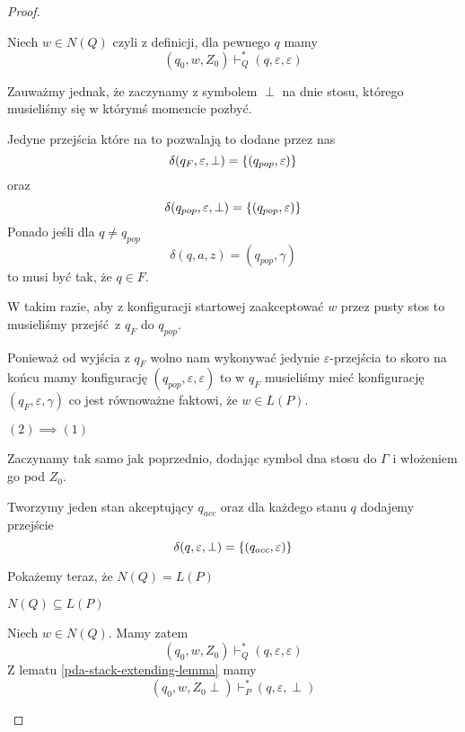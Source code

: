 \begin{proof}
\begin{description}
\begin{description}
			            Niech \( w \in N(Q) \) czyli z definicji, dla pewnego \( q \) mamy
			            \[
				            (q_0, w, Z_0) \vdash_Q^* (q, \varepsilon, \varepsilon)
			            \]

			            Zauważmy jednak, że zaczynamy z symbolem \( \perp \) na dnie stosu, którego musieliśmy się w którymś momencie pozbyć.

			            Jedyne przejścia które na to pozwalają to dodane przez nas
			            \[
				            \delta(q_F, \varepsilon, \perp) = \set{(q_{pop}, \varepsilon)}
			            \]
			            oraz
			            \[
				            \delta(q_{pop}, \varepsilon, \perp) = \set{(q_{pop}, \varepsilon)}
			            \]
			            Ponado jeśli dla \( q \neq q_{pop} \)
			            \[
				            \delta(q, a, z) = {(q_{pop}, \gamma)}
			            \]
			            to musi być tak, że \( q \in F \).

			            W takim razie, aby z konfiguracji startowej zaakceptować \( w \) przez pusty stos to musieliśmy przejść z \( q_F \) do \( q_{pop} \).

			            Ponieważ od wyjścia z \( q_F \) wolno nam wykonywać jedynie \(\varepsilon\)-przejścia to skoro na końcu mamy konfigurację \( (q_{pop}, \varepsilon, \varepsilon) \) to w \( q_F \) musieliśmy mieć konfigurację \( (q_F, \varepsilon, \gamma) \) co jest równoważne faktowi, że \( w \in L(P) \).


		      \end{description}

		\item \( (2) \implies (1) \)

		      Zaczynamy tak samo jak poprzednio, dodając symbol dna stosu do \( \Gamma \) i włożeniem go pod \( Z_0 \).

		      Tworzymy jeden stan akceptujący \( q_{acc} \) oraz dla każdego stanu \( q \) dodajemy przejście
		      \[
			      \delta(q, \varepsilon, \perp) = \set{(q_{acc}, \varepsilon)}
		      \]

		      Pokażemy teraz, że \( N(Q) = L(P) \)

		      \begin{description}
			      \item \( N(Q) \subseteq L(P) \)

			            Niech \( w \in N(Q) \). Mamy zatem
			            \[
				            (q_0, w, Z_0) \vdash_Q^* (q, \varepsilon, \varepsilon)
			            \]
			            Z lematu \ref{pda-stack-extending-lemma} mamy
			            \[
				            (q_0, w, Z_0\perp) \vdash_P^* (q, \varepsilon, \perp)
			            \]


\end{description}
\end{description}
\end{proof}
